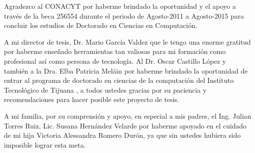
 Agradezco al CONACYT por haberme brindado la
oportunidad y el apoyo a trav\'es de la beca 256554 durante el periodo de
Agosto-2011 a Agosto-2015 para concluir los estudios de Doctorado en Ciencias en
Computaci\'on.

A mi director de tesis, Dr. Mario Garc\'ia Valdez  que le tengo una enorme
gratitud por haberme enseñado herramientas tan valiosas para mi formaci\'on como
profesional as\'i como persona de tecnología. Al Dr. Oscar Castillo L\'opez y también
a la Dra. Elba Patricia Mel\'ain por haberme brindado la oportunidad de entrar al
programa de doctorado en ciencias de la computación del Instituto Tecnológico de
Tijuana , a todos ustedes gracias por su paciencia y recomendaciones para hacer
posible este proyecto de tesis.

	
A mi familia, por su comprensi\'on y apoyo, en especial a mis padres, el Ing.
Julian Torres Ruiz, Lic. Susana Hern\'andez Velarde por haberme apoyado en el
cuidado de mi hija Victoria Alessandra Romero Dur\'on, ya que sin ustedes hubiera
sido imposible lograr esta meta.



\textit{}

